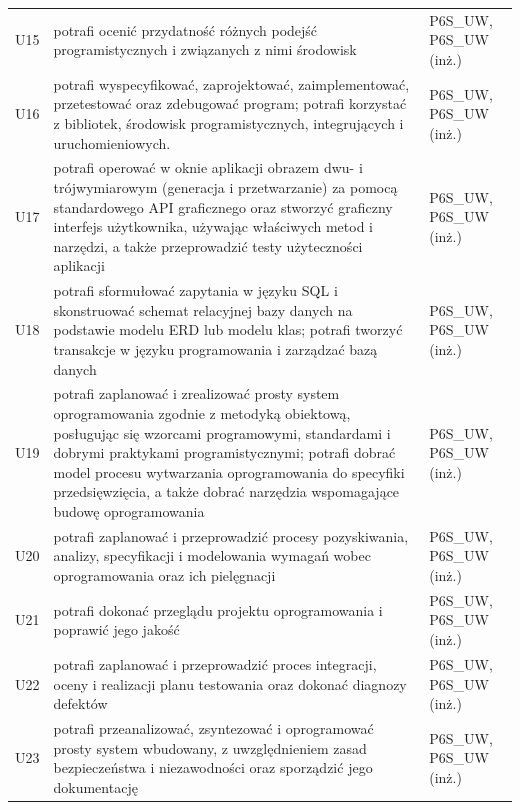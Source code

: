 \documentclass[12pt,a4paper]{article}
\begin{document}
{\begin{longtable}{m{1cm}m{9.5cm}m{3.9cm}}
\rowcolor{tableRowLight} U15 & potrafi ocenić przydatność różnych podejść programistycznych i związanych z nimi środowisk & {\scriptsize P6S\_UW, P6S\_UW {\scriptsize (inż.)}} \\
\rowcolor{tableRowAlt} U16 & potrafi wyspecyfikować,  zaprojektować, zaimplementować, przetestować oraz zdebugować program; potrafi korzystać z bibliotek, środowisk programistycznych, integrujących i uruchomieniowych. & {\scriptsize P6S\_UW, P6S\_UW {\scriptsize (inż.)}} \\
\rowcolor{tableRowLight} U17 & potrafi operować w oknie aplikacji obrazem dwu- i trójwymiarowym (generacja i przetwarzanie) za pomocą standardowego API graficznego oraz stworzyć graficzny interfejs użytkownika, używając właściwych metod i narzędzi, a także przeprowadzić testy użyteczności aplikacji & {\scriptsize P6S\_UW, P6S\_UW {\scriptsize (inż.)}} \\
\rowcolor{tableRowAlt} U18 & potrafi sformułować zapytania w języku SQL i skonstruować schemat relacyjnej bazy danych na podstawie modelu ERD lub modelu klas; potrafi tworzyć transakcje w języku programowania i zarządzać bazą danych & {\scriptsize P6S\_UW, P6S\_UW {\scriptsize (inż.)}} \\
\rowcolor{tableRowLight} U19 & potrafi zaplanować i zrealizować prosty system oprogramowania zgodnie z metodyką obiektową, posługując się wzorcami programowymi, standardami i dobrymi praktykami programistycznymi; potrafi dobrać model procesu wytwarzania oprogramowania do specyfiki przedsięwzięcia, a także dobrać narzędzia wspomagające budowę oprogramowania & {\scriptsize P6S\_UW, P6S\_UW {\scriptsize (inż.)}} \\
\rowcolor{tableRowAlt} U20 & potrafi zaplanować i przeprowadzić procesy pozyskiwania, analizy, specyfikacji i modelowania wymagań wobec  oprogramowania oraz ich pielęgnacji & {\scriptsize P6S\_UW, P6S\_UW {\scriptsize (inż.)}} \\
\rowcolor{tableRowLight} U21 & potrafi dokonać przeglądu projektu oprogramowania i poprawić jego jakość & {\scriptsize P6S\_UW, P6S\_UW {\scriptsize (inż.)}} \\
\rowcolor{tableRowAlt} U22 & potrafi zaplanować i przeprowadzić proces integracji, oceny i realizacji planu testowania oraz dokonać diagnozy defektów & {\scriptsize P6S\_UW, P6S\_UW {\scriptsize (inż.)}} \\
\rowcolor{tableRowLight} U23 & potrafi przeanalizować, zsyntezować i oprogramować prosty system wbudowany, z uwzględnieniem zasad bezpieczeństwa i niezawodności oraz sporządzić jego dokumentację & {\scriptsize P6S\_UW, P6S\_UW {\scriptsize (inż.)}} \\

\end{longtable}}
\end{document}
